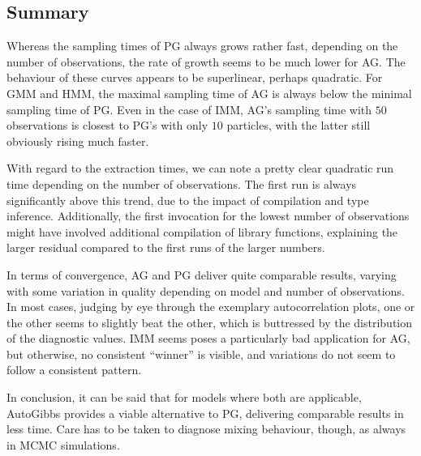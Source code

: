 \FloatBlock


\subsection*{Summary}

Whereas the sampling times of PG always grows rather fast, depending on the number of observations,
the rate of growth seems to be much lower for AG.  The behaviour of these curves appears to be
superlinear, perhaps quadratic.  For GMM and HMM, the maximal sampling time of AG is always below
the minimal sampling time of PG.  Even in the case of IMM, AG's sampling time with \(50\)
observations is closest to PG's with only \(10\) particles, with the latter still obviously rising
much faster.

With regard to the extraction times, we can note a pretty clear quadratic run time depending on the
number of observations.  The first run is always significantly above this trend, due to the impact
of compilation and type inference.  Additionally, the first invocation for the lowest number of
observations might have involved additional compilation of library functions, explaining the larger
residual compared to the first runs of the larger numbers.

In terms of convergence, AG and PG deliver quite comparable results, varying with some variation in
quality depending on model and number of observations.  In most cases, judging by eye through the
exemplary autocorrelation plots, one or the other seems to slightly beat the other, which is
buttressed by the distribution of the diagnostic values.  IMM seems poses a particularly bad
application for AG, but otherwise, no consistent \enquote{winner} is visible, and variations do not
seem to follow a consistent pattern.

In conclusion, it can be said that for models where both are applicable, AutoGibbs provides a viable
alternative to PG, delivering comparable results in less time.  Care has to be taken to diagnose
mixing behaviour, though, as always in MCMC simulations.


